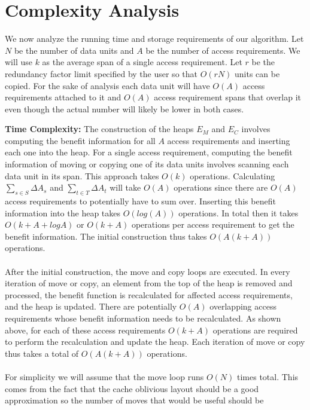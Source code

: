 \section{Complexity Analysis}

We now analyze the running time and storage requirements of our algorithm. Let
$N$ be the number of data units and $A$ be the number of access requirements.
We will use $k$ as the average span of a single access requirement. Let $r$ be the redundancy factor limit specified by the user so that $O(rN)$ units can be copied. For the sake of analysis each data unit will have $O(A)$ access requirements attached to it and $O(A)$ access requirement spans that overlap it even though the actual number will likely be lower in both cases. 

{\bf Time Complexity:} The construction of the heaps $E_M$ and $E_C$ involves
computing the benefit information for all $A$ access requirements and inserting
each one into the heap. For a single access requirement, computing the benefit information of moving or copying one of its data units involves scanning each data unit in its span. This approach takes $O(k)$ operations. Calculating $\sum_{s\in S}\Delta{A_s}$ and $\sum_{t\in T}\Delta{A_t}$ will take $O(A)$ operations since there are $O(A)$ access requirements to potentially have to sum over. Inserting this
benefit information into the heap takes $O(log (A))$ operations. In total then it takes $O(k + A + logA)$ or $O(k + A)$ operations per access requirement to get the benefit information. The initial construction thus takes $O(A(k+A))$ operations. \\
\\
After the initial construction, the move and copy loops are executed. In every iteration of move or copy, an element from the top of the heap is removed and processed, the benefit function is recalculated for affected access requirements, and the heap is updated. There are potentially $O(A)$ overlapping access requirements whose benefit information needs to be recalculated. As shown above, for each of these access requirements $O(k+A)$ operations are required to perform the recalculation and update the heap. Each iteration of move or copy thus takes a total of $O(A(k+A))$ operations.\\
\\
For simplicity we will assume that the move loop runs $O(N)$ times total. This comes from the fact that the
cache oblivious layout \cite{cacheobliviouslayout} should be a good
approximation so the number of moves that would be useful should be
